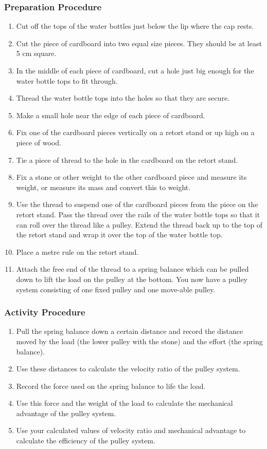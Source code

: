 \subsubsection*{Preparation Procedure}
\begin{enumerate}
\item{Cut off the tops of the water bottles just below the lip where the cap rests.}
\item{Cut the piece of cardboard into two equal size pieces.  They should be at least 5 cm square.}
\item{In the middle of each piece of cardboard, cut a hole just big enough for the water bottle tops to fit through.}
\item{Thread the water bottle tops into the holes so that they are secure.}
\item{Make a small hole near the edge of each piece of cardboard.}
\item{Fix one of the cardboard pieces vertically on a retort stand or up high on a piece of wood.}
\item{Tie a piece of thread to the hole in the cardboard on the retort stand.}
\item{Fix a stone or other weight to the other cardboard piece and measure its weight, or measure its mass and convert this to weight.}
\item{Use the thread to suspend one of the cardboard pieces from the piece on the retort stand.  Pass the thread over the rails of the water bottle tops so that it can roll over the thread like a pulley.  Extend the thread back up to the top of the retort stand and wrap it over the top of the water bottle top.}
\item{Place a metre rule on the retort stand.}
\item{Attach the free end of the thread to a spring balance which can be pulled down to lift the load on the pulley at the bottom.  You now have a pulley system consisting of one fixed pulley and one move-able pulley.}
\end{enumerate}

\subsubsection*{Activity Procedure}
\begin{enumerate}
\item{Pull the spring balance down a certain distance and record the distance moved by the load (the lower pulley with the stone) and the effort (the spring balance).}
\item{Use these distances to calculate the velocity ratio of the pulley system.}
\item{Record the force used on the spring balance to life the load.}
\item{Use this force and the weight of the load to calculate the mechanical advantage of the pulley system.}
\item{Use your calculated values of velocity ratio and mechanical advantage to calculate the efficiency of the pulley system.}
\end{enumerate}

